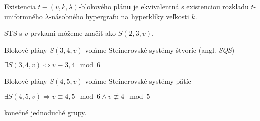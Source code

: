 \begin{remark}
Existencia $t-(v,k,\lambda)$-blokového plánu je ekvivalentná s existenciou rozkladu $t$-uniformného $\lambda$-násobného hypergrafu na hyperklíky veľkosti $k$.
\end{remark}

\begin{remark}
STS s $v$ prvkami môžeme značiť ako $S(2,3,v)$.
\end{remark}

\begin{definition}
Blokové plány $S(3,4,v)$ voláme Steinerovské systémy štvoríc (angl. \emph{SQS})
\end{definition}

\begin{theorem_hard}

$\exists S(3,4,v) \Longleftrightarrow v \equiv 3,4 \mod 6$

\end{theorem_hard}


\begin{definition}
Blokové plány $S(4,5,v)$ voláme Steinerovské systémy pätíc
\end{definition}


\begin{theorem_hard}

$\exists S(4,5,v) \Longrightarrow v \equiv 4,5 \mod 6 \wedge v \not\equiv 4 \mod 5$

\end{theorem_hard}

\TODO konečné jednoduché grupy.
